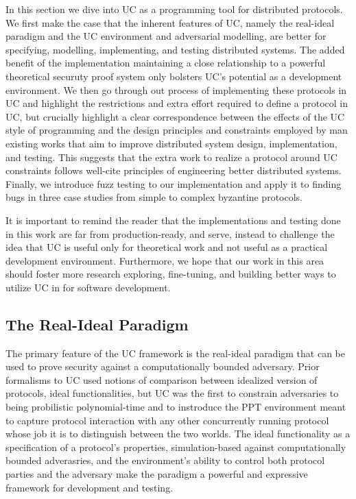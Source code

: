 In this section we dive into UC as a programming tool for distributed protocols.
We first make the case that the inherent features of UC, namely the real-ideal paradigm and the UC environment and adversarial modelling, are better for specifying, modelling, implementing, and testing distributed systems.
The added benefit of the implementation maintaining a close relationship to a powerful theoretical securuty proof system only bolsters UC's potential as a development environment.
We then go through out process of implementing these protocols in UC and highlight the restrictions and extra effort required to define a protocol in UC, but crucially highlight a clear correspondence between the effects of the UC style of programming and the design principles and constraints employed by man existing works that aim to improve distributed system design, implementation, and testing. 
This suggests that the extra work to realize a protocol around UC constraints follows well-cite principles of engineering better distributed systems.
Finally, we introduce fuzz testing to our implementation and apply it to finding bugs in three case studies from simple to complex byzantine protocols.

It is important to remind the reader that the implementations and testing done in this work are far from production-ready, and serve, instead to challenge the idea that UC is useful only for theoretical work and not useful as a practical development environment.
Furthermore, we hope that our work in this area should foster more research exploring, fine-tuning, and building better ways to utilize UC in for software development.


\subsection{The Real-Ideal Paradigm}
The primary feature of the UC framework is the real-ideal paradigm that can be used to prove security against a computationally bounded adversary.
Prior formalisms to UC used notions of comparison between idealized version of protocols, ideal functionalities, but UC was the first to constrain adversaries to being probilistic polynomial-time and to instroduce the PPT environment meant to capture protocol interaction with any other concurrently running protocol whose job it is to distinguish between the two worlds.
The ideal functionality as a specification of a protocol's properties, simulation-based against computationally bounded adverasries, and the environment's ability to control both protocol parties and the adversary make the paradigm a powerful and expressive framework for development and testing.

